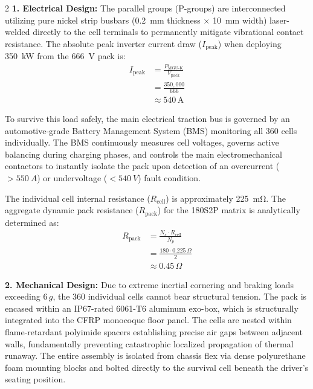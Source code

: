 \begin{multicols}{2}
\textbf{1. Electrical Design:}
The parallel groups (P-groups) are interconnected utilizing pure nickel strip busbars (\SI{0.2}{\milli\metre} thickness $\times$ \SI{10}{\milli\metre} width) laser-welded directly to the cell terminals to permanently mitigate vibrational contact resistance. The absolute peak inverter current draw ($I_{\text{peak}}$) when deploying \SI{350}{\kilo\watt} from the \SI{666}{\volt} pack is:
\begin{equation}
\begin{split}
I_{\text{peak}} &= \frac{P_{\text{MGU-K}}}{V_{\text{pack}}} \\
&= \frac{350{,}000}{666} \\
&\approx 540\,\mathrm{A}
\end{split}
\end{equation}

To survive this load safely, the main electrical traction bus is governed by an automotive-grade Battery Management System (BMS) monitoring all 360 cells individually. The BMS continuously measures cell voltages, governs active balancing during charging phases, and controls the main electromechanical contactors to instantly isolate the pack upon detection of an overcurrent ($>\SI{550}{A}$) or undervoltage ($<\SI{540}{V}$) fault condition.

The individual cell internal resistance ($R_{\text{cell}}$) is approximately \SI{225}{\milli\ohm}. The aggregate dynamic pack resistance ($R_{\text{pack}}$) for the 180S2P matrix is analytically determined as:
\begin{equation} \label{eq:pack_resistance}
\begin{split}
R_{\text{pack}} &= \frac{N_s \cdot R_{\text{cell}}}{N_p} \\
&= \frac{180 \cdot 0.225\,\Omega}{2} \\
&\approx 0.45\,\Omega
\end{split}
\end{equation}

\textbf{2. Mechanical Design:}
Due to extreme inertial cornering and braking loads exceeding 6\,$g$, the 360 individual cells cannot bear structural tension. The pack is encased within an IP67-rated 6061-T6 aluminum exo-box, which is structurally integrated into the CFRP monocoque floor panel. The cells are nested within flame-retardant polyimide spacers establishing precise air gaps between adjacent walls, fundamentally preventing catastrophic localized propagation of thermal runaway. The entire assembly is isolated from chassis flex via dense polyurethane foam mounting blocks and bolted directly to the survival cell beneath the driver's seating position.


\end{multicols}
